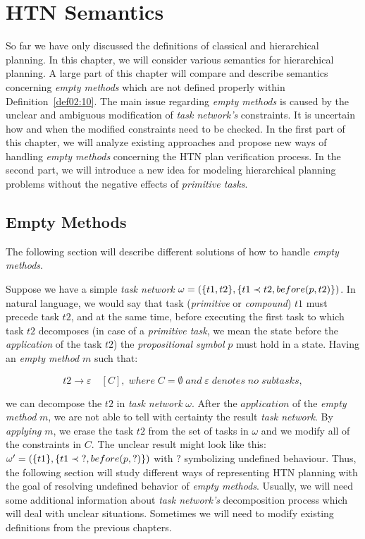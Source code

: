 \chapter{{HTN} Semantics}

\medskip\noindent
So far we have only discussed the definitions of classical and hierarchical planning. In this chapter, we will consider various semantics for hierarchical planning. A large part of this chapter will compare and describe semantics concerning \emph{empty methods} which are not defined properly within Definition~\ref{def02:10}. The main issue regarding \emph{empty methods} is caused by the unclear and ambiguous modification of \emph{task network's} constraints. It is uncertain how and when the modified constraints need to be checked. In the first part of this chapter, we will analyze existing approaches and propose new ways of handling \emph{empty methods} concerning the HTN plan verification process. In the second part, we will introduce a new idea for modeling hierarchical planning problems without the negative effects of \emph{primitive tasks}.

\section{Empty Methods}

\medskip\noindent
The following section will describe different solutions of how to handle \emph{empty methods}.

\begin{example}\label{ex03:6}
    Suppose we have a simple \emph{task network} $\omega = (\{t1, t2\}, \{t1 \prec t2, \\ before(p, t2)\})$. In natural language, we would say that task (\emph{primitive} or \emph{compound}) $t1$ must precede task $t2$, and at the same time, before executing the first task to which task $t2$ decomposes (in case of a \emph{primitive task}, we mean the state before the \emph{application} of the task $t2$) the \emph{propositional symbol} $p$ must hold in a state. Having an \emph{empty method} $m$ such that:
    
    \[
        t2 \rightarrow \varepsilon \quad [C], \; where \; C = \emptyset \; and \; \varepsilon \; denotes \; no \; subtasks,
    \]
    
    \noindent
    we can decompose the $t2$ in \emph{task network} $\omega$. After the $application$ of the \emph{empty method} $m$, we are not able to tell with certainty the result \emph{task network}. By \emph{applying} $m$, we erase the task $t2$ from the set of tasks in $\omega$ and we modify all of the constraints in $C$. The unclear result might look like this: $\omega' = (\{t1\}, \{t1 \prec \; ?, \\ before(p, ?)\})$ with $?$ symbolizing undefined behaviour. Thus, the following section will study different ways of representing HTN planning with the goal of resolving undefined behavior of \emph{empty methods}. Usually, we will need some additional information about \emph{task network's} decomposition process which will deal with unclear situations. Sometimes we will need to modify existing definitions from the previous chapters.
\end{example}

